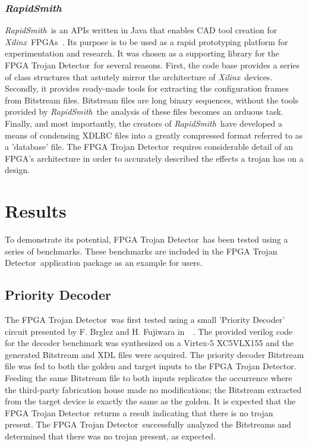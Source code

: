 \documentclass[conference]{IEEEtran}
\newcommand{\Xilinx}{\textit{\gls{Xilinx}}~}
\newcommand{\Name}{\acrshort{FPGA} Trojan Detector}
\newcommand{\NameNoPeriod}{\Name~}
\newcommand{\RapidSmith}{\textit{RapidSmith}~}
\begin{document}
\subsubsection{\RapidSmith} \label{sec:rapidSmith}
\RapidSmith is an \acrfull{APIs} written in Java that enables \acrfull{CAD} tool creation for \Xilinx \acrshort{FPGA}s~\cite{rapidSmith}.
Its purpose is to be used as a rapid prototyping platform for experimentation and research.
It was chosen as a supporting library for the \NameNoPeriod for several reasons.
First, the code base provides a series of class structures that astutely mirror the architecture of \Xilinx devices.
Secondly, it provides ready-made tools for extracting the configuration frames from \gls{Bitstream} files. 
\gls{Bitstream} files are long binary sequences, without the tools provided by \RapidSmith the analysis of these files becomes an arduous task.
Finally, and most importantly, the creators of \RapidSmith have developed a means of condensing XDLRC files into a greatly compressed format referred to as a 'database' file.
The \NameNoPeriod requires considerable detail of an \acrshort{FPGA}'s architecture in order to accurately described the effects a trojan has on a design.
\section{Results} \label{sec:results}
To demonstrate its potential, \NameNoPeriod has been tested using a series of benchmarks.
These benchmarks are included in the \NameNoPeriod application package as an example for users.
\subsection{Priority Decoder} \label{sec:priorityDecoder}
The \NameNoPeriod was first tested using a small 'Priority Decoder' circuit presented by F. Brglez and H. Fujiwara
in~~\cite{iscas85}.
The provided verilog code for the decoder benchmark was synthesized on a Virtex-5 XC5VLX155 and the generated \gls{Bitstream} and \acrshort{XDL} files were acquired.
The priority decoder \gls{Bitstream} file was fed to both the \gls{golden} and \gls{target} inputs to the \Name.
Feeding the same \gls{Bitstream} file to both inputs replicates the occurrence where the third-party fabrication house made no modifications; the \gls{Bitstream} extracted from the \gls{target} device is exactly the same as the \gls{golden}.
It is expected that the \NameNoPeriod returns a result indicating that there is no trojan present.
The \NameNoPeriod successfully analyzed the \gls{Bitstream}s and determined that there was no trojan present, as expected.
\end{document}

